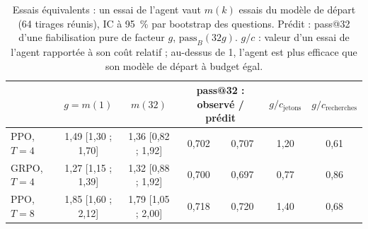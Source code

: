 \begin{table}[h]\centering\small
\begin{tabular}{lcccccc}\toprule
 & $g = m(1)$ & $m(32)$ & \multicolumn{2}{c}{pass@32 : observé / prédit} & $g/c_{\text{jetons}}$ & $g/c_{\text{recherches}}$\\\midrule
PPO, $T = 4$ & 1,49 [1,30 ; 1,70] & 1,36 [0,82 ; 1,92] & 0,702 & 0,707 & 1,20 & 0,61\\
GRPO, $T = 4$ & 1,27 [1,15 ; 1,39] & 1,32 [0,88 ; 1,92] & 0,700 & 0,697 & 0,77 & 0,86\\
PPO, $T = 8$ & 1,85 [1,60 ; 2,12] & 1,79 [1,05 ; 2,00] & 0,718 & 0,720 & 1,40 & 0,68\\\bottomrule
\end{tabular}
\caption{Essais équivalents : un essai de l'agent vaut $m(k)$ essais du modèle de départ (64 tirages réunis), IC à 95~\% par bootstrap des questions. Prédit : pass@32 d'une fiabilisation pure de facteur $g$, $\text{pass}_B(32 g)$. $g/c$ : valeur d'un essai de l'agent rapportée à son coût relatif ; au-dessus de 1, l'agent est plus efficace que son modèle de départ à budget égal.}\label{tab:equivalents}
\end{table}

